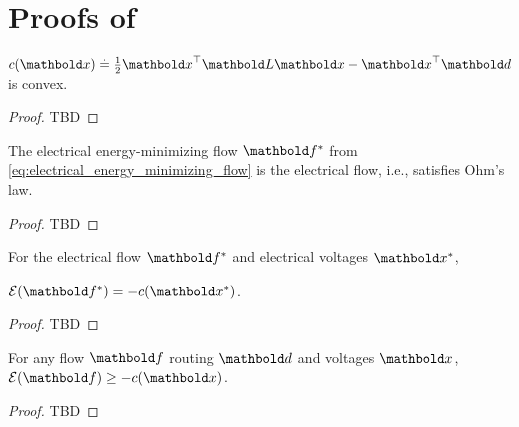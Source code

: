 
\chapter{Proofs of }

\begin{lem}\label{lem:a1}
$c(\vx) \defeq \frac{1}{2}\trans{\vx}\mL\vx - \trans{\vx}\vd$ is convex.
\end{lem}
\begin{proof} TBD
\end{proof}

\begin{lem}\label{lem:a2}
The electrical energy-minimizing flow $\s{\vf}$ from \cref{eq:electrical_energy_minimizing_flow} is the electrical flow, i.e., satisfies Ohm's law.
\end{lem}
\begin{proof} TBD
\end{proof}

\begin{lem}\label{lem:a3}
For the electrical flow $\s{\vf}$ and electrical voltages $\s{\vx}$,\par\noindent $\mathcal{E}(\s{\vf}) = -c(\s{\vx})$.
\end{lem}
\begin{proof} TBD
\end{proof}

\begin{lem}\label{lem:a4}
For any flow $\vf$ routing $\vd$ and voltages $\vx$, $\mathcal{E}(\vf) \geq -c(\vx)$.
\end{lem}
\begin{proof} TBD
\end{proof}